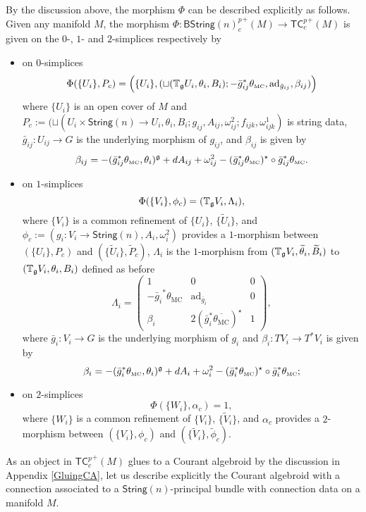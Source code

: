 \documentclass[letterpaper,10pt, oneside]{article} %
\newcommand{\tcalgdp}{{\mathsf{TC}^{p}_{c}}} %
\newcommand{\tcalgdpp}{{\mathsf{TC}^{p}_{c}}^+} %
\newcommand{\bstringnp}{\mathsf{BString}(n)^p_{c}} %
\newcommand{\String}{\mathsf{String}}%
\newcommand{\tagui}{{\mathbb{T}_\g U_i}}
\newcommand{\tagvi}{{\mathbb{T}_\g V_i}}
\newcommand{\TM}{\theta_{\scriptscriptstyle \mathrm{MC}}}
\newcommand{\ad}{\mathrm{ad}}
\begin{document}
By the discussion above, the morphism $\Phi$ can be described explicitly as follows. Given any manifold $M$, the morphism $\Phi:{\bstringnp}^+(M)\rightarrow {\tcalgdp}^+(M)$ is given on the $0$-, $1$- and $2$-simplices respectively by
\begin{itemize}
    \item
on $0$-simplices
\[\Phi(\{U_i\},P_{c})=\Big(\{U_i\}, (\sqcup (\tagui,  \theta_i, B_i);-\bar{g}_{ij}^*\TM,\ad_{\bar{g}_{ij}},\beta_{ij} ) \Big)\]
where $\{U_i\}$ is an open cover of $M$ and $P_{c}:=(\sqcup (U_i\times \String(n)\to U_i, \theta_i, B_i;g_{ij}, A_{ij}, \omega^2_{ij}; f_{ijk}, \omega^1_{ijk})$ is string data, $\bar{g}_{ij}:U_{ij} \to G$ is the underlying morphism of $g_{ij}$,  and $\beta_{ij}$ is given by $$\beta_{ij}=-(\bar{g}_{ij}^*\TM,\theta_i)^\g+dA_{ij}+\omega^2_{ij}-(\bar{g}_{ij}^*\TM)^\star \circ \bar{g}_{ij}^*\TM.$$
\item on $1$-simplices
\[\Phi(\{V_i\},\phi_{c})=(\tagvi, \Lambda_i),\]
where $\{V_i\}$ is a common refinement of $\{U_i\}$, $\{\widetilde{U}_i\}$, and $\phi_{c}:=(g_i:V_i\rightarrow \String(n), A_i,\omega^2_i)$ provides a $1$-morphism between $(\{U_i\},P_{c})$ and $(\{\widetilde{U}_i\},\widetilde{P}_{c})$, $\Lambda_i$ is the $1$-morphism from $(\tagvi,\widetilde{\theta}_i,\widetilde{B}_i)$ to  $(\tagvi,\theta_i,B_i)$ defined as before
$$\Lambda_{i}=\left(\begin{array}{ccc}
1&0&0\\
-{\bar{g}_{i}}^*\TM&\ad_{\bar{g}_{i}}&0\\
\beta_{i}&2(\bar{g}_{i}^*\overline{\TM})^\star&1
\end{array}\right),$$
where $\bar{g}_{i}:V_{i}\rightarrow G$ is the underlying morphism of $g_i$ and $\beta_i:TV_{i}\longrightarrow T^*V_{i}$ is given by
$$\beta_i=-(\bar{g}_{i}^*\TM,\theta_i)^\g+dA_{i}+\omega^2_{i}-(\bar{g}_{i}^*\TM)^\star \circ \bar{g}_{i}^*\TM;$$
\item on $2$-simplices
\[\Phi(\{W_i\},\alpha_{c})=1,\]
where $\{W_i\}$ is a common refinement of $\{V_i\}$, $\{\widetilde{V}_i\}$, and $\alpha_{c}$ provides a $2$-morphism between $(\{V_i\},\phi_{c})$ and $(\{\widetilde{V}_i\},\widetilde{\phi}_{c})$.
\end{itemize}

As an object in ${\tcalgdpp(M)}$ glues to a Courant algebroid by the  discussion in Appendix \ref{GluingCA},  let us describe explicitly the Courant algebroid with a connection associated to a $\String(n)$-principal bundle with  connection data on a manifold $M$.
\end{document}
